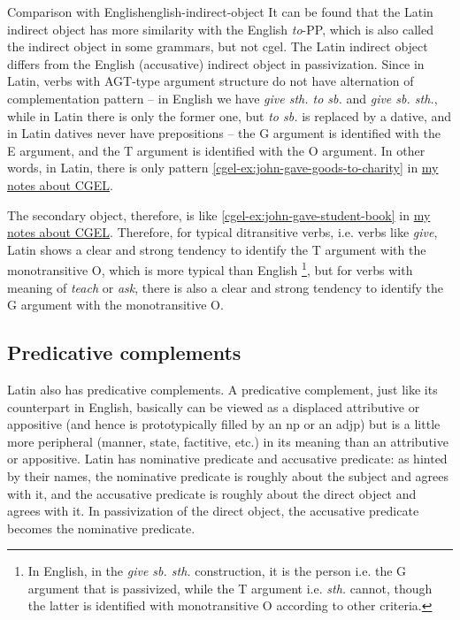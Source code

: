\documentclass[UTF8, a4paper, oneside]{report}
\newcommand{\corpus}[1]{\emph{#1}}
\newcommand{\cgel}{\href{../English/cambridge.pdf}{my notes about CGEL}}
\begin{document}
\begin{infobox}{Comparison with English}{english-indirect-object}
    It can be found that the Latin indirect object has more similarity with the English \corpus{to}-PP,
    which is also called the indirect object in some grammars, but not \ac{cgel}.
    The Latin indirect object differs from the English (accusative) indirect object in passivization.
    Since in Latin, verbs with AGT-type argument structure do not have alternation of complementation pattern
    -- in English we have \corpus{give sth. to sb.} and \corpus{give sb. sth.}, 
    while in Latin there is only the former one, but \corpus{to sb.} is replaced by a dative,
    and in Latin datives never have prepositions --
    the G argument is identified with the E argument,
    and the T argument is identified with the O argument.
    In other words, in Latin, there is only pattern \eqref{cgel-ex:john-gave-goods-to-charity} in \cgel.
    
    The secondary object, therefore, is like \eqref{cgel-ex:john-gave-student-book} in \cgel.
    Therefore, for typical ditransitive verbs, i.e. verbs like \corpus{give}, 
    Latin shows a clear and strong tendency to identify the T argument with the monotransitive O,
    which is more typical than English%
    \footnote{
        In English, in the \corpus{give sb. sth.} construction, it is the person i.e. the G argument that is passivized,
        while the T argument i.e. \corpus{sth.} cannot, though the latter is identified with monotransitive O
        according to other criteria. 
    },
    but for verbs with meaning of \corpus{teach} or \corpus{ask},
    there is also a clear and strong tendency to identify the G argument with the monotransitive O.
\end{infobox}

\subsection{Predicative complements}

Latin also has predicative complements.
A predicative complement, just like its counterpart in English,
basically can be viewed as a displaced attributive or appositive 
(and hence is prototypically filled by an \ac{np} or an \acs{adjp})
but is a little more peripheral (manner, state, factitive, etc.) 
in its meaning than an attributive or appositive.
Latin has nominative predicate and accusative predicate:
as hinted by their names, 
the nominative predicate is roughly about the subject and agrees with it,
and the accusative predicate is roughly about the direct object and agrees with it.
In passivization of the direct object,
the accusative predicate becomes the nominative predicate.
\end{document}
